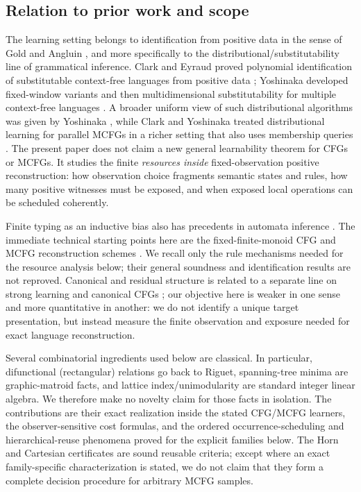 \documentclass[11pt]{article}
\begin{document}
\subsection*{Relation to prior work and scope}

The learning setting belongs to identification from positive data in the sense of
Gold and Angluin \cite{Gold1967,Angluin1980}, and more specifically to the
distributional/substitutability line of grammatical inference.  Clark and Eyraud proved polynomial
identification of substitutable context-free languages from positive data
\cite{ClarkEyraud2007}; Yoshinaka developed fixed-window variants and then
multidimensional substitutability for multiple context-free languages
\cite{Yoshinaka2008,Yoshinaka2011}.  A broader uniform view of such
distributional algorithms was given by Yoshinaka \cite{Yoshinaka2015}, while
Clark and Yoshinaka treated distributional learning for parallel MCFGs in a
richer setting that also uses membership queries \cite{ClarkYoshinaka2014}.
The present paper does not claim a new general learnability theorem for CFGs or
MCFGs.  It studies the finite \emph{resources inside} fixed-observation
positive reconstruction: how observation choice fragments semantic states and
rules, how many positive witnesses must be exposed, and when exposed local
operations can be scheduled coherently.

Finite typing as an inductive bias also has precedents in automata inference
\cite{CosteTyping2004}.  The immediate technical starting points here are the
fixed-finite-monoid CFG and MCFG reconstruction schemes
\cite{KuriyamaCFG,KuriyamaMCFG}.  We recall only the rule mechanisms needed for
the resource analysis below; their general soundness and identification
results are not reproved.  Canonical and residual structure is related to a
separate line on strong learning and canonical CFGs \cite{Clark2015}; our
objective here is weaker in one sense and more quantitative in another: we do
not identify a unique target presentation, but instead measure the finite
observation and exposure needed for exact language reconstruction.

Several combinatorial ingredients used below are classical.  In particular,
difunctional (rectangular) relations go back to Riguet, spanning-tree minima
are graphic-matroid facts, and lattice index/unimodularity are standard integer
linear algebra.  We therefore make no novelty claim for those facts in
isolation.  The contributions are their exact realization inside the stated
CFG/MCFG learners, the observer-sensitive cost formulas, and the ordered
occurrence-scheduling and hierarchical-reuse phenomena proved for the explicit
families below.  The Horn and Cartesian certificates are sound reusable
criteria; except where an exact family-specific characterization is stated, we
do not claim that they form a complete decision procedure for arbitrary MCFG
samples.
\end{document}

